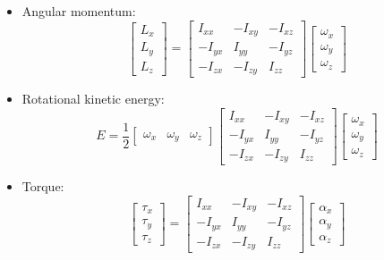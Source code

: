 \begin{itemize} 
   \item Angular momentum:
   \[
   \begin{bmatrix} L_x \\ L_y \\ L_z \end{bmatrix} = 
   \begin{bmatrix}
   I_{xx} & -I_{xy} & -I_{xz} \\
   -I_{yx} & I_{yy} & -I_{yz} \\
   -I_{zx} & -I_{zy} & I_{zz}
   \end{bmatrix}
   \begin{bmatrix} \omega_x \\ \omega_y \\ \omega_z \end{bmatrix}
   \]
   
   \item Rotational kinetic energy: 
   \[
   E = \frac{1}{2}\begin{bmatrix} \omega_x & \omega_y & \omega_z \end{bmatrix}
   \begin{bmatrix}
   I_{xx} & -I_{xy} & -I_{xz} \\
   -I_{yx} & I_{yy} & -I_{yz} \\
   -I_{zx} & -I_{zy} & I_{zz}
   \end{bmatrix}
   \begin{bmatrix} \omega_x \\ \omega_y \\ \omega_z \end{bmatrix}
   \]
   
   \item Torque: 
   \[
   \begin{bmatrix} \tau_x \\ \tau_y \\ \tau_z \end{bmatrix} = 
   \begin{bmatrix}
   I_{xx} & -I_{xy} & -I_{xz} \\
   -I_{yx} & I_{yy} & -I_{yz} \\
   -I_{zx} & -I_{zy} & I_{zz}
   \end{bmatrix}
   \begin{bmatrix} \alpha_x \\ \alpha_y \\ \alpha_z \end{bmatrix}
   \]
\end{itemize}

